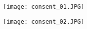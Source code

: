 \begin{figure}
    \centering
    \texttt{[image: consent\_01.JPG]}
    \label{fig:eda_filtering}
\end{figure}
\begin{figure}
    \centering
    \texttt{[image: consent\_02.JPG]}
    \label{fig:eda_filtering}
\end{figure}

